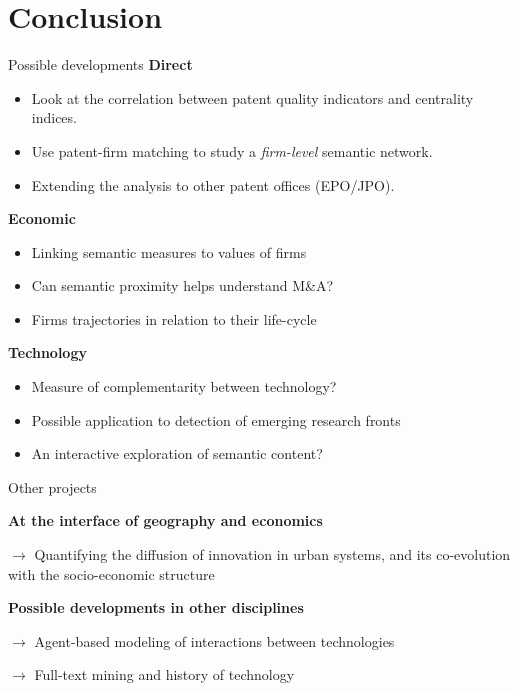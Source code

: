 \documentclass{beamer}
\begin{document}
\section{Conclusion}
\begin{frame}{Possible developments}
\textbf{Direct}
    \begin{itemize}
        \item Look at the correlation between patent quality indicators and centrality indices.
        \item Use patent-firm matching to study a \emph{firm-level} semantic network.
        \item Extending the analysis to other patent offices (EPO/JPO).
    \end{itemize}
    \pause
\textbf{Economic}
    \begin{itemize}
        \item Linking semantic measures to values of firms
        \item Can semantic proximity helps understand M\&A?
        \item Firms trajectories in relation to their life-cycle
    \end{itemize}
    \pause
\textbf{Technology}
\begin{itemize}
    \item Measure of complementarity between technology?
    \item Possible application to detection of emerging research fronts
    \item An interactive exploration of semantic content?
\end{itemize}
\end{frame}
\begin{frame}{Other projects}
     
     \textbf{At the interface of geography and economics}
     
     \smallskip
     
     $\rightarrow$ Quantifying the diffusion of innovation in urban systems, and its co-evolution with the socio-economic structure
     
     \smallskip
     
     \bigskip
     
     \textbf{Possible developments in other disciplines}
     
      \smallskip
     
     $\rightarrow$ Agent-based modeling of interactions between technologies
     
     \smallskip
     
     $\rightarrow$ Full-text mining and history of technology \\

\end{frame}
\end{document}
